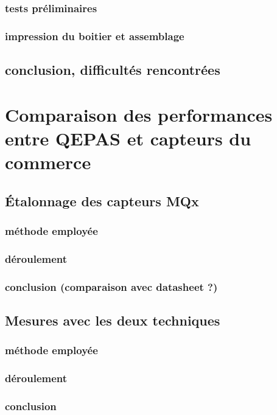\documentclass[a4paper]{report}
\begin{document}
	\subsection{tests préliminaires}
	\subsection{impression du boitier et assemblage}
	
	\section{conclusion, difficultés rencontrées}

	\chapter{Comparaison des performances entre QEPAS et capteurs du commerce}
	\section{Étalonnage des capteurs MQx}
	\subsection{méthode employée}
	\subsection{déroulement}
	\subsection{conclusion (comparaison avec datasheet ?)}
	
	\section{Mesures avec les deux techniques}
	\subsection{méthode employée}
	\subsection{déroulement}
	\subsection{conclusion}
	

\end{document}

